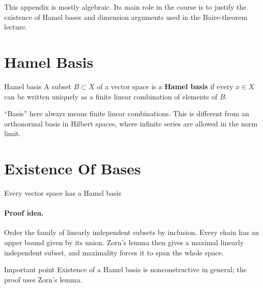\documentclass[header={Appendix C Exam Study Notes}]{study-note}
\begin{document}

\vspace{0.8em}

\begin{focusbox}
This appendix is mostly algebraic. Its main role in the course is to justify the existence of Hamel bases and dimension arguments used in the Baire-theorem lecture.
\end{focusbox}

\tableofcontents

\section{Hamel Basis}

\begin{defbox}{Hamel basis}
A subset $B\subset X$ of a vector space is a \textbf{Hamel basis} if every $x\in X$ can be written uniquely as a finite linear combination of elements of $B$.
\end{defbox}

\begin{focusbox}
``Basis'' here always means finite linear combinations. This is different from an orthonormal basis in Hilbert spaces, where infinite series are allowed in the norm limit.
\end{focusbox}

\section{Existence Of Bases}

\begin{thmbox}{Every vector space has a Hamel basis}
\thmHamelBasis
\end{thmbox}

\paragraph{Proof idea.}
Order the family of linearly independent subsets by inclusion. Every chain has an upper bound given by its union. Zorn's lemma then gives a maximal linearly independent subset, and maximality forces it to span the whole space.

\begin{warningbox}{Important point}
Existence of a Hamel basis is nonconstructive in general; the proof uses Zorn's lemma.
\end{warningbox}
\end{document}
